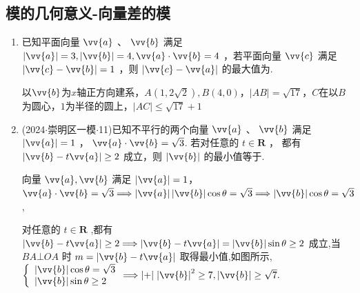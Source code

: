 \subsection*{模的几何意义-向量差的模}
\begin{enumerate}
    \item 已知平面向量 $\vv{a}$ 、 $\vv{b}$ 满足 $\left| \vv{a}\right|  = 3,\left| \vv{b}\right|  = 4,\vv{a} \cdot  \vv{b} = 4$ ，若平面向量 $\vv{c}$ 满足 $\left| {\vv{c} - \vv{b}}\right|  = 1$ ，则 $\left| {\vv{c} - \vv{a}}\right|$ 的最大值为.
    \begin{jieda}
        以$\vv{b}$为$x$轴正方向建系，$A(1, 2\sqrt{2}), B(4, 0)$，$|AB| = \sqrt{17}$，$C$在以$B$为圆心，$1$为半径的圆上，$|AC| \leq \sqrt{17} + 1$
    \end{jieda}
    \item (2024$\cdot$崇明区一模$\cdot$11)已知不平行的两个向量 $\vv{a}$ 、 $\vv{b}$ 满足 $\left| \vv{a}\right|  = 1$ ， $\vv{a} \cdot  \vv{b} = \sqrt{3}$. 若对任意的 $t \in  \mathbf{R}$ ， 都有 $\left| {\vv{b} - t\vv{a}}\right|  \geq  2$ 成立，则 $\left| \vv{b}\right|$ 的最小值等于.
    \begin{jieda}
        向量 $\vv{a},\vv{b}$ 满足 $\left| \vv{a}\right|  = 1$，$\vv{a} \cdot  \vv{b} = \sqrt{3} \Longrightarrow  \left| \vv{a}\right| \left| \vv{b}\right| \cos \theta  = \sqrt{3} \Longrightarrow  \left| \vv{b}\right| \cos \theta  = \sqrt{3}$ ,

        对任意的 $t \in  \mathbf{R}$ ,都有 $\left| {\vv{b} - t\vv{a}}\right|  \geq  2 \Longrightarrow  \left| {\vv{b} - t\vv{a}}\right|  = \left| \vv{b}\right| \sin \theta  \geq  2$ 成立,当 ${BA} \bot  {OA}$ 时 $m = \left| {\vv{b} - t\vv{a}}\right|$ 取得最小值,如图所示, $\left\{  {\begin{array}{l} \left| \vv{b}\right| \cos \theta  = \sqrt{3} \\  \left| \vv{b}\right| \sin \theta  \geq  2 \end{array} \Longrightarrow  \left| +\right| }\right.  {\left| \vv{b}\right| }^{2} \geq  7,\left| \vv{b}\right|  \geq  \sqrt{7}.$


\end{jieda}
\end{enumerate}
